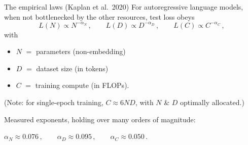 \documentclass[11pt]{beamer}
\newcommand{\hl}[1]{{\color{blue!60!black}\textbf{#1}}}
\begin{document}
\begin{frame}{The empirical laws (Kaplan et al.\ 2020)}
  For autoregressive language models, when not bottlenecked by the other
  resources, test loss obeys
  \[
    L(N) \propto N^{-\alpha_N}\,,\qquad
    L(D) \propto D^{-\alpha_D}\,,\qquad
    L(C) \propto C^{-\alpha_C}\,,
  \]
  with
  \begin{itemize}
  \item \hl{$N$} $=$ parameters (non-embedding)
  \item \hl{$D$} $=$ dataset size (in tokens)
  \item $C$ $=$ training compute (in FLOPs).
  \end{itemize} \pause
  (Note: for single-epoch training, $C\approx 6ND$, with $N$ \& $D$ optimally allocated.) 
  
  \medskip
  Measured exponents, holding over many orders of magnitude:
  \begin{center}
    $\alpha_N \approx 0.076\,,\qquad
    \alpha_D \approx 0.095\,,\qquad
    \alpha_C \approx 0.050\,.$
  \end{center}
\end{frame}
\end{document}
